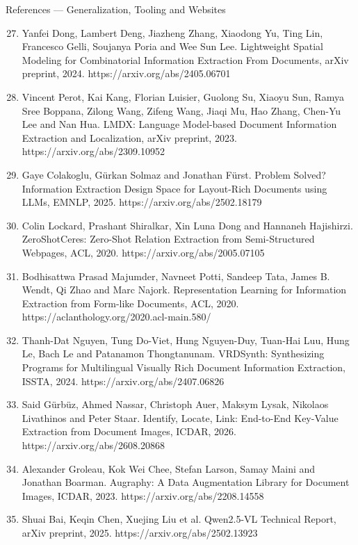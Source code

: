 \documentclass[aspectratio=169, 11pt]{beamer}
\newcommand{\reffont}{\fontsize{4.6}{5.2}\selectfont}
\begin{document}
\begin{frame}{References — Generalization, Tooling and Websites}
  \reffont
  {\setlength{\itemsep}{0pt}\setlength{\topsep}{1pt}\setlength{\parsep}{0pt}
  \begin{enumerate}\setcounter{enumi}{26}
    \item Yanfei Dong, Lambert Deng, Jiazheng Zhang, Xiaodong Yu, Ting Lin, Francesco Gelli, Soujanya Poria and Wee Sun Lee. Lightweight Spatial Modeling for Combinatorial Information Extraction From Documents, arXiv preprint, 2024. https://arxiv.org/abs/2405.06701
    \item Vincent Perot, Kai Kang, Florian Luisier, Guolong Su, Xiaoyu Sun, Ramya Sree Boppana, Zilong Wang, Zifeng Wang, Jiaqi Mu, Hao Zhang, Chen-Yu Lee and Nan Hua. LMDX: Language Model-based Document Information Extraction and Localization, arXiv preprint, 2023. https://arxiv.org/abs/2309.10952
    \item Gaye Colakoglu, Gürkan Solmaz and Jonathan Fürst. Problem Solved? Information Extraction Design Space for Layout-Rich Documents using LLMs, EMNLP, 2025. https://arxiv.org/abs/2502.18179
    \item Colin Lockard, Prashant Shiralkar, Xin Luna Dong and Hannaneh Hajishirzi. ZeroShotCeres: Zero-Shot Relation Extraction from Semi-Structured Webpages, ACL, 2020. https://arxiv.org/abs/2005.07105
    \item Bodhisattwa Prasad Majumder, Navneet Potti, Sandeep Tata, James B. Wendt, Qi Zhao and Marc Najork. Representation Learning for Information Extraction from Form-like Documents, ACL, 2020. https://aclanthology.org/2020.acl-main.580/
    \item Thanh-Dat Nguyen, Tung Do-Viet, Hung Nguyen-Duy, Tuan-Hai Luu, Hung Le, Bach Le and Patanamon Thongtanunam. VRDSynth: Synthesizing Programs for Multilingual Visually Rich Document Information Extraction, ISSTA, 2024. https://arxiv.org/abs/2407.06826
    \item Said Gürbüz, Ahmed Nassar, Christoph Auer, Maksym Lysak, Nikolaos Livathinos and Peter Staar. Identify, Locate, Link: End-to-End Key-Value Extraction from Document Images, ICDAR, 2026. https://arxiv.org/abs/2608.20868
    \item Alexander Groleau, Kok Wei Chee, Stefan Larson, Samay Maini and Jonathan Boarman. Augraphy: A Data Augmentation Library for Document Images, ICDAR, 2023. https://arxiv.org/abs/2208.14558
    \item Shuai Bai, Keqin Chen, Xuejing Liu et al. Qwen2.5-VL Technical Report, arXiv preprint, 2025. https://arxiv.org/abs/2502.13923
  \end{enumerate}}


\end{frame}
\end{document}
